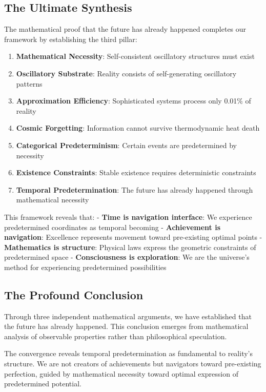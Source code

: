 \documentclass[11pt]{article}
\theoremstyle{remark}
\begin{document}
\subsection{The Ultimate Synthesis}

The mathematical proof that the future has already happened completes our framework by establishing the third pillar:

\begin{enumerate}
\item \textbf{Mathematical Necessity}: Self-consistent oscillatory structures must exist
\item \textbf{Oscillatory Substrate}: Reality consists of self-generating oscillatory patterns
\item \textbf{Approximation Efficiency}: Sophisticated systems process only 0.01\% of reality
\item \textbf{Cosmic Forgetting}: Information cannot survive thermodynamic heat death
\item \textbf{Categorical Predeterminism}: Certain events are predetermined by necessity
\item \textbf{Existence Constraints}: Stable existence requires deterministic constraints
\item \textbf{Temporal Predetermination}: The future has already happened through mathematical necessity
\end{enumerate}

This framework reveals that:
- \textbf{Time is navigation interface}: We experience predetermined coordinates as temporal becoming
- \textbf{Achievement is navigation}: Excellence represents movement toward pre-existing optimal points
- \textbf{Mathematics is structure}: Physical laws express the geometric constraints of predetermined space
- \textbf{Consciousness is exploration}: We are the universe's method for experiencing predetermined possibilities

\subsection{The Profound Conclusion}

Through three independent mathematical arguments, we have established that the future has already happened. This conclusion emerges from mathematical analysis of observable properties rather than philosophical speculation.

The convergence reveals temporal predetermination as fundamental to reality's structure. We are not creators of achievements but navigators toward pre-existing perfection, guided by mathematical necessity toward optimal expression of predetermined potential.
\end{document}
